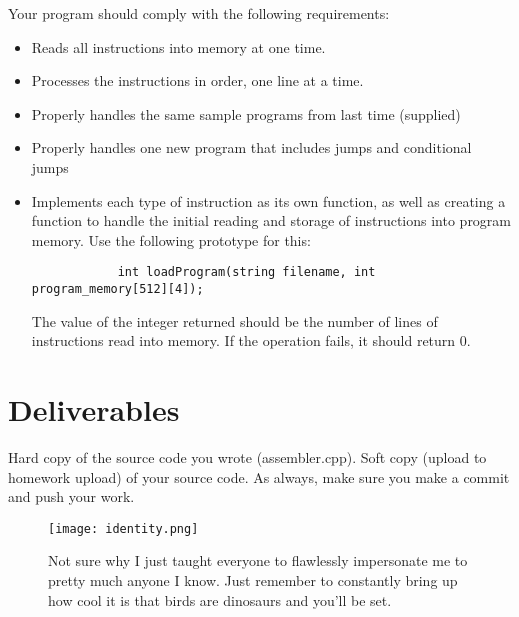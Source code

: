 \documentclass[letterpaper,12pt]{article}
\begin{document}
\begin{enumerate}
    Your program should comply with the following requirements:
    \begin{itemize}
        \item Reads all instructions into memory at one time.
        \item Processes the instructions in order, one line at a time.
        \item Properly handles the same sample programs from last time (supplied)
        \item Properly handles one new program that includes jumps and conditional jumps
        \item Implements each type of instruction as its own function, as well as creating
            a function to handle the initial reading and storage of instructions into program
            memory. Use the following prototype for this:
            \begin{lstlisting}
            int loadProgram(string filename, int program_memory[512][4]);
            \end{lstlisting}
            The value of the integer returned should be the number of lines of instructions
            read into memory. If the operation fails, it should return 0.
    \end{itemize}
\end{enumerate}
\section*{Deliverables}
Hard copy of the source code you wrote (assembler.cpp). Soft copy (upload to homework upload) of
your source code. As always, make sure you make a commit and push your work.

\begin{figure}[ht!]
	\centering
	\texttt{[image: identity.png]}
    \caption*{Not sure why I just taught everyone to flawlessly impersonate me to pretty much anyone I know. Just remember to constantly bring up how cool it is that birds are dinosaurs and you'll be set.}
\end{figure}
\end{document}
